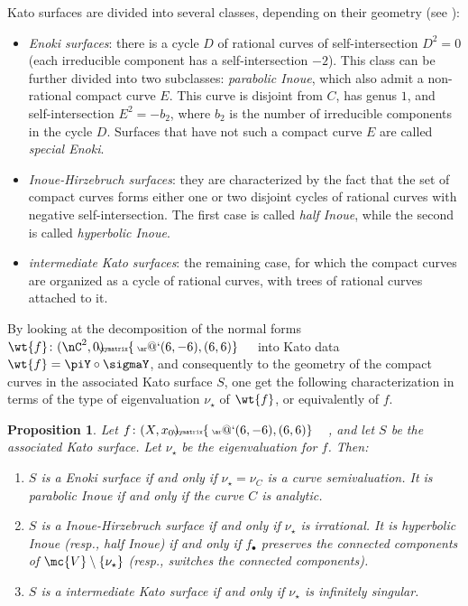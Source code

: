 \documentclass[11 pt, twoside, a4paper]{amsart}
\makeatletter
\newcommand{\selfarrow}[1][]{\tiny{\!\!\!\xymatrix{\phantom{|}\ar@`{(6,-6),(6,6)}}\hspace{4mm}}}
\newtheorem{prop}[thm]{Proposition}
\theoremstyle{definition}
\theoremstyle{definition}
\makeatother
\begin{document}
Kato surfaces are divided into several classes, depending on their geometry (see \cite{dloussky:phdthesis}):
\begin{itemize}
\item \emph{Enoki surfaces}: there is a cycle $D$ of rational curves of self-intersection $D^2=0$ (each irreducible component has a self-intersection $-2$).
This class can be further divided into two subclasses: \emph{parabolic Inoue}, which also admit a non-rational compact curve $E$. This curve is disjoint from $C$, has genus $1$, and self-intersection $E^2=-b_2$, where $b_2$ is the number of irreducible components in the cycle $D$. Surfaces that have not such a compact curve $E$ are called \emph{special Enoki}.

\item \emph{Inoue-Hirzebruch surfaces}: they are characterized by the fact that the set of compact curves forms either one or two disjoint cycles of rational curves with negative self-intersection. The first case is called \emph{half Inoue}, while the second is called \emph{hyperbolic Inoue}.
\item \emph{intermediate Kato surfaces}: the remaining case, for which the compact curves are organized as a cycle of rational curves, with trees of rational curves attached to it.  
\end{itemize}

By looking at the decomposition of the normal forms $\wt{f} \colon (\nC^2,0) \selfarrow$ into Kato data $\wt{f}=\piY \circ \sigmaY$, and consequently to the geometry of the compact curves in the associated Kato surface $S$, one get the following characterization in terms of the type of eigenvaluation $\nu_\star$ of $\wt{f}$, or equivalently of $f$.

\begin{prop}
Let $f\colon (X,x_0) \selfarrow$, and let $S$ be the associated Kato surface.
Let $\nu_\star$ be the eigenvaluation for $f$. Then:
\begin{enumerate}
\item $S$ is a Enoki surface if and only if $\nu_\star=\nu_C$ is a curve semivaluation.
It is parabolic Inoue if and only if the curve $C$ is analytic.
\item $S$ is a Inoue-Hirzebruch surface if and only if $\nu_\star$ is irrational.
It is hyperbolic Inoue (resp., half Inoue) if and only if $f_\bullet$ preserves the connected components of $\mc{V} \setminus \{\nu_\star\}$ (resp., switches the connected components).
\item $S$ is a intermediate Kato surface if and only if $\nu_\star$ is infinitely singular.
\end{enumerate}
\end{prop}
\end{document}
